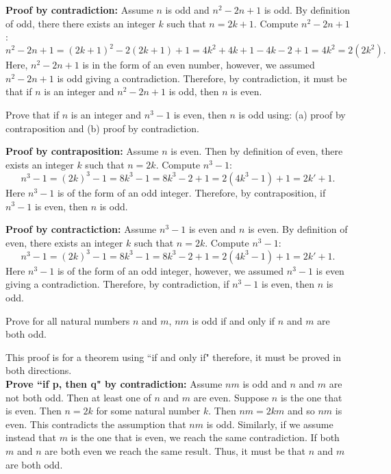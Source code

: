 \begin{questions}
\begin{solution}
    \medskip
    \textbf{Proof by contradiction:} Assume $n$ is odd and $n^2 - 2n + 1$ is
    odd.  By definition of odd, there there exists an
    integer $k$ such that $n=2k+1$.  Compute $n^2 - 2n + 1$:
    \[ n^2 - 2n + 1 = (2k+1)^2 - 2(2k+ 1) + 1 = 4k^2 + 4k+ 1 - 4k - 2 + 1 = 4k^2 = 2(2k^2). \]
    Here, $n^2 - 2n + 1$ is in the form of an even number, however, we assumed
    $n^2 -2n +1$ is odd giving a contradiction. Therefore, by
    contradiction, it must be that if $n$ is an integer and $n^2 - 2n + 1$ is
    odd, then $n$ is even.
\end{solution}



  Prove that if $n$ is an integer and $n^3 -1$ is even,
then $n$ is odd using: (a) proof by contraposition and (b) proof by
contradiction.
    \ifprintanswers
        \vspace{-10pt}
    \fi
\begin{solution} \textbf{Proof by contraposition:}
  Assume $n$ is even.  Then by definition of even, there exists an integer $k$ such that $n=2k$.  Compute $n^3 - 1$: 
  \[ n^3 - 1 = (2k)^3 - 1 = 8k^3 - 1 = 8k^3 -2 +1 = 2(4k^3 - 1) +1 = 2k' + 1. \]
  Here $n^3 - 1$ is of the form of an odd integer.  Therefore, by contraposition, if $n^3 -1$ is even, then $n$ is odd. 

  \medskip
  \textbf{Proof by contractiction:}
  Assume $n^3 -1$ is even and $n$ is even.  By definition of even, there exists an integer $k$ such that $n=2k$.  Compute $n^3 - 1$: 
  \[ n^3 - 1 = (2k)^3 - 1 = 8k^3 - 1 = 8k^3 -2 +1 = 2(4k^3 - 1) +1 = 2k' + 1. \]
  Here $n^3 - 1$ is of the form of an odd integer, however, we assumed $n^3 -1$ is even giving a contradiction. Therefore, by contradiction, if $n^3 - 1$ is even, then $n$ is odd.   
\end{solution}




 Prove for all natural numbers $n$ and $m$, $nm$ is odd if
and only if $n$ and $m$ are both odd.
    \ifprintanswers
        \vspace{-10pt}
    \fi
\begin{solution}
     This proof is for a theorem using ``if and only if" therefore,
     it must be proved in both directions.  \\
    \textbf{Prove ``if p, then q" by contradiction:} Assume $nm$ is
    odd and $n$ and $m$ are not both odd.  Then at least one of $n$
    and $m$ are even.  Suppose $n$ is the one that is even. Then
    $n=2k$ for some natural number $k$.  Then $nm = 2km$ and so $nm$
    is even.  This contradicts the assumption that $nm$ is odd.
    Similarly, if we assume instead that $m$ is the one that is even,
    we reach the same contradiction.   If both $m$ and $n$ are both
    even we reach the same result.  Thus, it must be that $n$ and
    $m$ are both odd.


\end{solution}
\end{questions}
